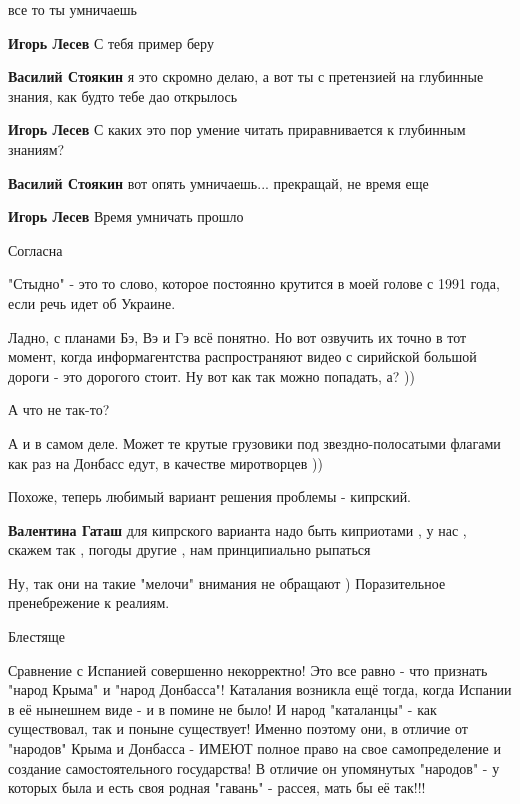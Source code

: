 \begin{itemize}
\begin{itemize} %
все то ты умничаешь

\textbf{Игорь Лесев} С тебя пример беру

\textbf{Василий Стоякин} я это скромно делаю, а вот ты с претензией на глубинные знания, как будто тебе дао открылось

\textbf{Игорь Лесев} С каких это пор умение читать приравнивается к глубинным знаниям?

\textbf{Василий Стоякин} вот опять умничаешь... прекращай, не время еще

\textbf{Игорь Лесев} Время умничать прошло
\end{itemize} %

Согласна

"Стыдно" - это то слово, которое постоянно крутится в моей голове с 1991 года, если речь идет об Украине.


Ладно, с планами Бэ, Вэ и Гэ всё понятно. Но вот озвучить их точно в тот
момент, когда информагентства распространяют видео с сирийской большой дороги -
это дорогого стоит. Ну вот как так можно попадать, а? ))

\begin{itemize} %
А что не так-то?

А и в самом деле. Может те крутые грузовики под звездно-полосатыми флагами как раз на Донбасс едут, в качестве миротворцев ))
\end{itemize} %

Похоже, теперь любимый вариант решения проблемы - кипрский.

\begin{itemize} %
\textbf{Валентина Гаташ} для кипрского варианта надо быть киприотами , у нас , скажем так , погоды другие , нам принципиально рыпаться

Ну, так они на такие "мелочи" внимания не обращают ) Поразительное пренебрежение к реалиям.
\end{itemize} %

Блестяще


Сравнение с Испанией совершенно некорректно! Это все равно - что признать
"народ Крыма" и "народ Донбасса"! Каталания возникла ещё тогда, когда Испании в
её нынешнем виде - и в помине не было! И народ "каталанцы" - как существовал,
так и поныне существует! Именно поэтому они, в отличие от "народов" Крыма и
Донбасса - ИМЕЮТ полное право на свое самопределение и создание
самостоятельного государства! В отличие он упомянутых "народов" - у которых
была и есть своя родная "гавань" - рассея, мать бы её так!!!


\end{itemize}
